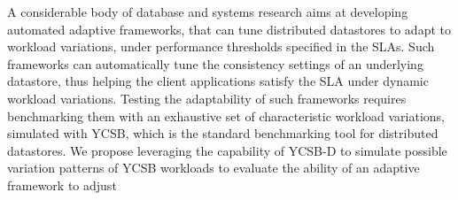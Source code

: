 \documentclass[conference]{IEEEtran}
\begin{document}
             \par %
              A considerable body of database and systems research \cite{conf/wecwis/YuV00, Terry:2013:CSL:2517349.2522731, Ardekani:2014:SGC:2685048.2685077} %
                aims at developing automated adaptive frameworks, that can tune distributed datastores to adapt to workload variations, under performance thresholds specified in
              the SLAs. Such frameworks can automatically tune the consistency settings of an
              underlying datastore, thus helping the client applications satisfy the SLA under dynamic workload
              variations. Testing the adaptability of such frameworks requires benchmarking them with an exhaustive
              set of characteristic workload variations, simulated with YCSB, which is the standard benchmarking
              tool for distributed datastores. We propose leveraging the capability of YCSB-D to simulate possible
               variation patterns of YCSB workloads to evaluate the ability of an adaptive framework to adjust
\end{document}
